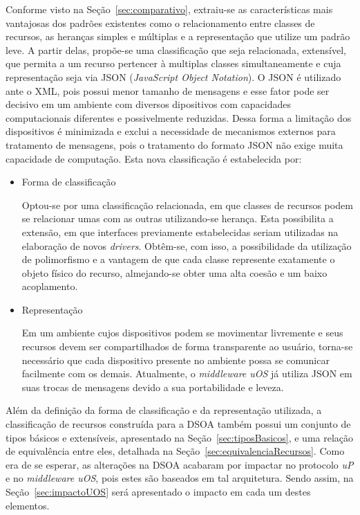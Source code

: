 Conforme visto na Seção~\ref{sec:comparativo}, extraiu-se as características mais vantajosas dos padrões existentes como o relacionamento entre classes de recursos, as heranças simples e múltiplas e a representação que utilize um padrão leve. A partir delas, propõe-se uma classificação que seja relacionada, extensível, que permita a um recurso pertencer à multiplas classes simultaneamente e cuja representação seja via JSON (\emph{JavaScript Object Notation}). O JSON é utilizado ante o XML, pois possui menor tamanho de mensagens e esse fator pode ser decisivo em um ambiente com diversos dipositivos com capacidades computacionais diferentes e possivelmente reduzidas. Dessa forma a limitação dos dispositivos é minimizada e exclui a necessidade de mecanismos externos para tratamento de mensagens, pois o tratamento do formato JSON não exige muita capacidade de computação. Esta nova classificação é estabelecida por:

\begin{itemize}
	\item Forma de classificação

	Optou-se por uma classificação relacionada, em que classes de recursos podem se relacionar umas com as outras utilizando-se herança. Esta possibilita a extensão, em que interfaces previamente estabelecidas seriam utilizadas na elaboração de novos \emph{drivers}. Obtêm-se, com isso, a possibilidade da utilização de polimorfismo e a vantagem de que cada classe represente exatamente o objeto físico do recurso, almejando-se obter uma alta coesão e um baixo acoplamento.

	\item Representação

	Em um ambiente cujos dispositivos podem se movimentar livremente e seus recursos devem ser compartilhados de forma transparente ao usuário, torna-se necessário que cada dispositivo presente no ambiente possa se comunicar facilmente com os demais. Atualmente, o \emph{middleware uOS} já utiliza JSON em suas trocas de mensagens devido a sua portabilidade e leveza.
\end{itemize}

Além da definição da forma de classificação e da representação utilizada, a classificação de recursos construída para a DSOA também possui um conjunto de tipos básicos e extensíveis, apresentado na Seção~\ref{sec:tiposBasicos}, e uma relação de equivalência entre eles, detalhada na Seção~\ref{sec:equivalenciaRecursos}. Como era de se esperar, as alterações na DSOA acabaram por impactar no protocolo \emph{uP} e no \emph{middleware uOS}, pois estes são baseados em tal arquitetura. Sendo assim, na Seção~\ref{sec:impactoUOS} será apresentado o impacto em cada um destes elementos.

